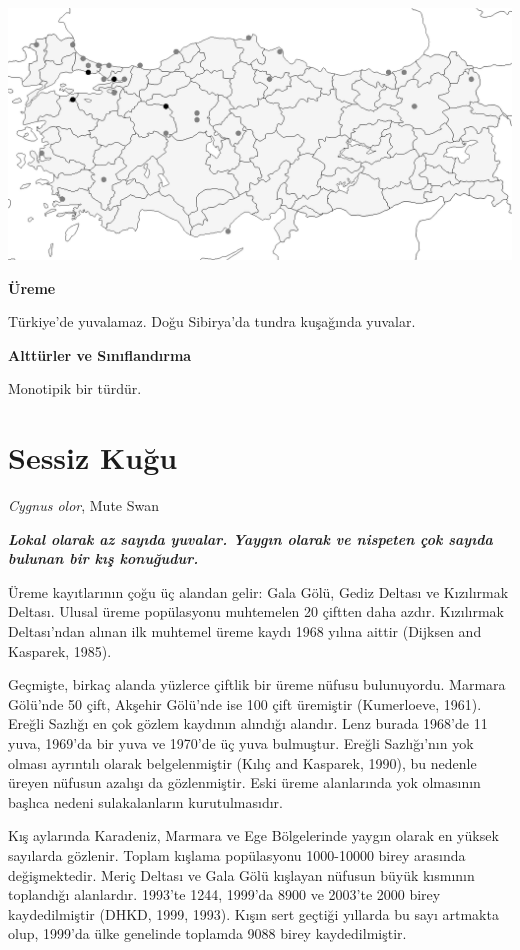\documentclass[
  a4paper,
  DIV=11,
  numbers=noendperiod]{scrartcl}
\begin{document}
\includegraphics{images/harita_Branta ruficollis.png}

\textbf{Üreme}

Türkiye'de yuvalamaz. Doğu Sibirya'da tundra kuşağında yuvalar.

\textbf{Alttürler ve Sınıflandırma}

Monotipik bir türdür.

\section{Sessiz Kuğu}\label{sessiz-kuux11fu}

\emph{Cygnus olor}, Mute Swan

\textbf{\emph{Lokal olarak az sayıda yuvalar. Yaygın olarak ve nispeten
çok sayıda bulunan bir kış konuğudur.}}

Üreme kayıtlarının çoğu üç alandan gelir: Gala Gölü, Gediz Deltası ve
Kızılırmak Deltası. Ulusal üreme popülasyonu muhtemelen 20 çiftten daha
azdır. Kızılırmak Deltası'ndan alınan ilk muhtemel üreme kaydı 1968
yılına aittir (Dijksen and Kasparek, 1985).

Geçmişte, birkaç alanda yüzlerce çiftlik bir üreme nüfusu bulunuyordu.
Marmara Gölü'nde 50 çift, Akşehir Gölü'nde ise 100 çift üremiştir
(Kumerloeve, 1961). Ereğli Sazlığı en çok gözlem kaydının alındığı
alandır. Lenz burada 1968'de 11 yuva, 1969'da bir yuva ve 1970'de üç
yuva bulmuştur. Ereğli Sazlığı'nın yok olması ayrıntılı olarak
belgelenmiştir (Kılıç and Kasparek, 1990), bu nedenle üreyen nüfusun
azalışı da gözlenmiştir. Eski üreme alanlarında yok olmasının başlıca
nedeni sulakalanların kurutulmasıdır.

Kış aylarında Karadeniz, Marmara ve Ege Bölgelerinde yaygın olarak en
yüksek sayılarda gözlenir. Toplam kışlama popülasyonu 1000-10000 birey
arasında değişmektedir. Meriç Deltası ve Gala Gölü kışlayan nüfusun
büyük kısmının toplandığı alanlardır. 1993'te 1244, 1999'da 8900 ve
2003'te 2000 birey kaydedilmiştir (DHKD, 1999, 1993). Kışın sert geçtiği
yıllarda bu sayı artmakta olup, 1999'da ülke genelinde toplamda 9088
birey kaydedilmiştir.
\end{document}
